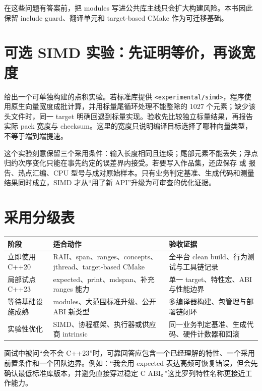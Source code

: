 在这些问题有答案前，把 modules 写进公共库主线只会扩大构建风险。本书因此保留 include guard、翻译单元和 target-based CMake 作为可迁移基础。

\section{可选 SIMD 实验：先证明等价，再谈宽度}

 给出一个可单独构建的点积实验。若标准库提供 \texttt{<experimental/simd>}，程序使用原生向量宽度成批计算，并用标量尾循环处理不能整除的 1027 个元素；缺少该头文件时，同一 target 明确回退到标量实现。验收先比较独立标量结果，再报告实际 pack 宽度与 checksum。这里的宽度只说明编译目标选择了哪种向量类型，不等于端到端提速。

这个实验刻意保留三个采用条件：输入长度相同且连续；尾部元素不能丢失；浮点归约次序变化只能在事先约定的误差界内接受。若要写入作品集，还应保存  或  报告、热点汇编、CPU 型号与成对原始样本。只有业务判定基准、生成代码和测量结果同时成立，SIMD 才从“用了新 API”升级为可审查的优化证据。

\section{采用分级表}

\begin{center}
\small
\begin{tabularx}{\textwidth}{p{}X X}
\toprule
阶段 & 适合动作 & 验收证据 \\
\midrule
立即使用 C++20 & RAII、span、ranges、concepts、jthread、target-based CMake & 全平台 clean build、行为测试与工具链记录 \\
局部试点 C++23 & expected、print、mdspan、补充 ranges 能力 & 单一 target、特性宏、ABI 与性能边界 \\
等待基础设施成熟 & modules、大范围标准升级、公开 ABI 新类型 & 多编译器构建、包管理与部署链闭环 \\
实验性优化 & SIMD、协程框架、执行器或供应商 intrinsic & 同一业务判定基准、生成代码、硬件计数器和回滚 \\
\bottomrule
\end{tabularx}
\end{center}

面试中被问“会不会 C++23”时，可靠回答应包含一个已经理解的特性、一个采用前置条件和一个团队边界。例如：“我会用 expected 表达高频可恢复错误，但会先确认最低标准库版本，并避免直接穿过稳定 C ABI。”这比罗列特性名称更接近工作能力。
